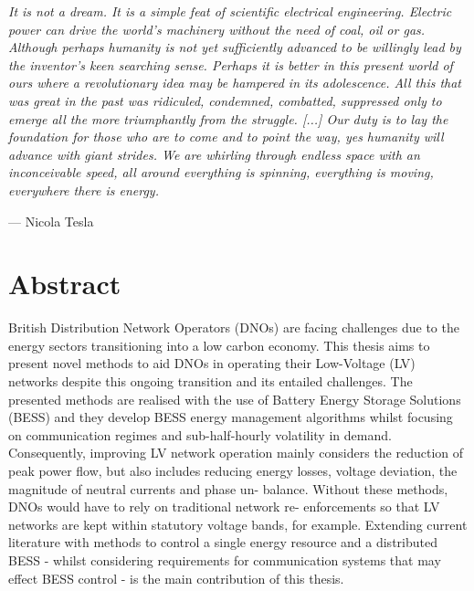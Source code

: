
\epigraph{\textit{It is not a dream. It is a simple feat of scientific electrical engineering. Electric power can drive the world's machinery without the need of coal, oil or gas. Although perhaps humanity is not yet sufficiently advanced to be willingly lead by the inventor's keen searching sense. Perhaps it is better in this present world of ours where a revolutionary idea may be hampered in its adolescence. All this that was great in the past was ridiculed, condemned, combatted, suppressed only to emerge all the more triumphantly from the struggle. [...] Our duty is to lay the foundation for those who are to come and to point the way, yes humanity will advance with giant strides. We are whirling through endless space with an inconceivable speed, all around everything is spinning, everything is moving, everywhere there is energy.}}{--- Nicola Tesla}


\chapter*{Abstract}




British Distribution Network Operators (DNOs) are facing challenges due to the\linebreak
energy sectors transitioning into a low carbon economy. This thesis aims to present\linebreak
novel methods to aid DNOs in operating their Low-Voltage (LV) networks despite this\linebreak
ongoing transition and its entailed challenges. The presented methods are realised\linebreak
with the use of Battery Energy Storage Solutions (BESS) and they develop BESS\linebreak
energy management algorithms whilst focusing on communication regimes and\linebreak
sub-half-hourly volatility in demand. Consequently, improving LV network operation\linebreak
mainly considers the reduction of peak power flow, but also includes reducing\linebreak
energy losses, voltage deviation, the magnitude of neutral currents and phase un-\linebreak
balance. Without these methods, DNOs would have to rely on traditional network re-\linebreak
enforcements so that LV networks are kept within statutory voltage bands, for\linebreak
example. Extending current literature with methods to control a single energy\linebreak
resource and a distributed BESS - whilst considering requirements for communication\linebreak
systems that may effect BESS control - is the main contribution of this thesis.

